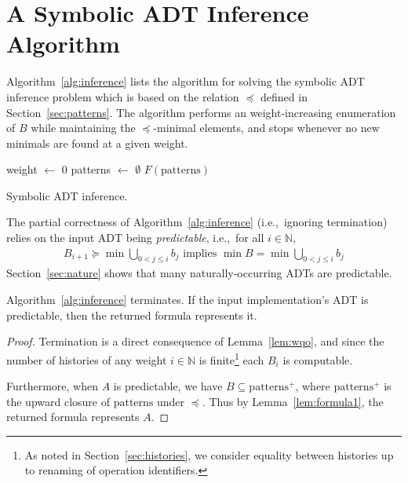 \section{A Symbolic ADT Inference Algorithm}
\label{sec:algorithm}

Algorithm~\ref{alg:inference} lists the algorithm for solving the symbolic ADT
inference problem which is based on the relation $\preceq$ defined in
Section~\ref{sec:patterns}. The algorithm performs an weight-increasing
enumeration of $B$ while maintaining the $\preceq$-minimal elements, and stops
whenever no new minimals are found at a given weight.

\begin{algorithm}[t]
  \SetAlgoLined
  weight $\gets$ $0$ \;
  patterns $\gets$ $\emptyset$ \;
  \Return $F(\text{patterns})$
  \caption{Symbolic ADT inference.}
  \label{alg:inference}
\end{algorithm}

The partial correctness of Algorithm~\ref{alg:inference} (i.e.,~ignoring
termination) relies on the input ADT being \emph{predictable}, i.e.,~for all
$i \in \mathbb{N}$,
\begin{align*}
  B_{i+1} \succeq \min \bigcup_{0 < j \le i} b_j
  \text{ implies } \min B = \min \bigcup_{0 < j \le i} b_j
\end{align*}
Section~\ref{sec:nature} shows that many naturally-occurring ADTs are predictable.

\begin{theorem}
  \label{thm:algorithm}

  Algorithm~\ref{alg:inference} terminates. If the input implementation’s
  ADT is predictable, then the returned formula represents it.

\end{theorem}

\begin{proof}
  Termination is a direct consequence of Lemma~\ref{lem:wqo}, and since the
  number of histories of any weight $i \in \mathbb{N}$ is finite\footnote{
    As noted in Section~\ref{sec:histories}, we consider equality between
    histories up to renaming of operation identifiers.
  }
  each $B_i$ is computable.

  Furthermore, when $A$ is predictable, we
  have $B \subseteq \text{patterns}^+$, where $\text{patterns}^+$ is the
  upward closure of $\text{patterns}$ under $\preceq$. Thus by
  Lemma~\ref{lem:formula1}, the returned formula represents $A$.
\end{proof}

